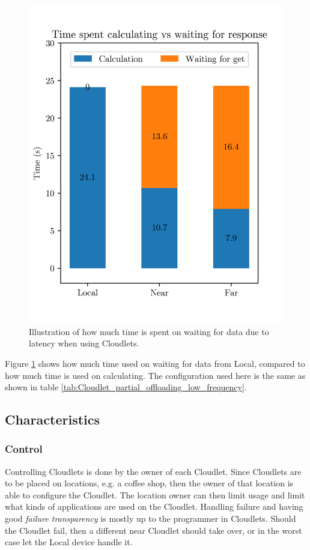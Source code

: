 \begin{figure}[t]
    \centering
    \includegraphics[scale=1]{chapters/6_evaluation/figures/bar_local_near_far_compare_low_interaction.png}
    \caption{Illustration of how much time is spent on waiting for data due to latency when using Cloudlets.}
    \label{fig:Cloudlet_latency_bar}
\end{figure}
Figure \ref{fig:Cloudlet_latency_bar} shows how much time used on waiting for data from Local, compared to how much time is used on calculating. The configuration used here is the same as shown in table \ref{tab:Cloudlet_partial_offloading_low_frequency}.




\subsection{Characteristics}
\subsubsection{Control}
Controlling Cloudlets is done by the owner of each Cloudlet. Since Cloudlets are to be placed on locations, e.g. a coffee shop, then the owner of that location is able to configure the Cloudlet. The location owner can then limit usage and limit what kinds of applications are used on the Cloudlet. Handling failure and having good \textit{failure transparency} is mostly up to the programmer in Cloudlets. Should the Cloudlet fail, then a different near Cloudlet should take over, or in the worst case let the Local device handle it. 

